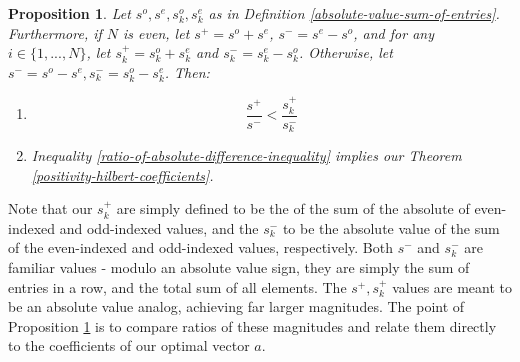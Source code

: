 \documentclass{article}
\newtheorem{prop}[thm]{Proposition}
\theoremstyle{definition}
\theoremstyle{remark}
\numberwithin{equation}{section}
\begin{document}
\begin{prop}\label{ratio-inequality-is-equivalent-to-main-theorem}
Let $s^o, s^e, s^o_k, s^e_k$ as in Definition \ref{absolute-value-sum-of-entries}. Furthermore, if $N$ is even, let $s^+ = s^o + s^e$, $s^- = s^e-s^o$, and for any $i\in \{1,...,N\}$, let $s_k^+ = s_k^o + s_k^e$ and $s_k^- = s_k^e- s_k^o$. Otherwise, let $s^- = s^o - s^e, s_k^- = s_k^o - s_k^e$. Then: 
\begin{enumerate}
\item \begin{equation}\label{ratio-of-absolute-difference-inequality}
\frac{s^+}{s^-} < \frac{s_k^+}{s_k^-} 
\end{equation}

\item Inequality \ref{ratio-of-absolute-difference-inequality} implies our Theorem \ref{positivity-hilbert-coefficients}.
\end{enumerate}
\end{prop}
Note that our $s_k^+$ are simply defined to be the of the sum of the absolute of even-indexed and odd-indexed values, and the $s_k^-$ to be the absolute value of the sum of the even-indexed and odd-indexed values, respectively. Both $s^-$ and $s_k^-$ are familiar values - modulo an absolute value sign, they are simply the sum of entries in a row, and the total sum of all elements. The $s^+, s_k^+$ values are meant to be an absolute value analog, achieving far larger magnitudes. The point of Proposition \ref{ratio-inequality-is-equivalent-to-main-theorem} is to compare ratios of these magnitudes and relate them directly to the coefficients of our optimal vector $\hat{a}$.
\end{document}
